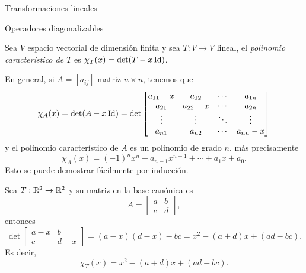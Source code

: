 \begin{chapter}{Transformaciones lineales}
\begin{section}{Operadores diagonalizables}
\begin{definicion}
            Sea $V$ espacio vectorial de dimensión finita y sea $T: V \to V$ lineal, el  \textit{polinomio característico de $T$} es $\chi_T(x) = \det(T- x \operatorname{Id})$.
        \end{definicion}
    
            
        En general,  si $A = [a_{ij}]$ matriz $n \times n$, tenemos que
        \begin{equation}
        \chi_A(x) = \det(A- x\operatorname{Id}) = \det
        \begin{bmatrix}
        a_{11}-x&a_{12}&\cdots&a_{1n}\\
        a_{21}&a_{22}-x&\cdots&a_{2n}\\
        \vdots&\vdots&\ddots&\vdots\\
        a_{n1}&a_{n2}&\cdots&a_{nn}-x\\
        \end{bmatrix}
        \end{equation} 
        y el polinomio característico de $A$ es un polinomio  de grado $n$,  más precisamente  
        $$
        \chi_A(x) =(-1)^nx^n + a_{n-1}x^{n-1}+ \cdots + a_1x + a_0.
        $$ 
        Esto se puede demostrar fácilmente por inducción. 
        
        \begin{ejemplo*}
            Sea $T: \mathbb R^2 \to \mathbb R^2$ y su matriz en la base canónica es
            \begin{equation*}
                A = \begin{bmatrix}
                    a&b\\c&d
                \end{bmatrix},
            \end{equation*}
        entonces
        \begin{equation*}
                 \det \begin{bmatrix}
                a-x & b \\ c &d-x
                \end{bmatrix} = 
                (a-x)(d-x) - bc = x^2 -(a+d)x + (ad -bc).
        \end{equation*}
        Es decir,
        $$
        \chi_T(x) = x^2 -(a+d)x + (ad -bc).
        $$ 
        \end{ejemplo*}

    
    

\end{section}
\end{chapter}
